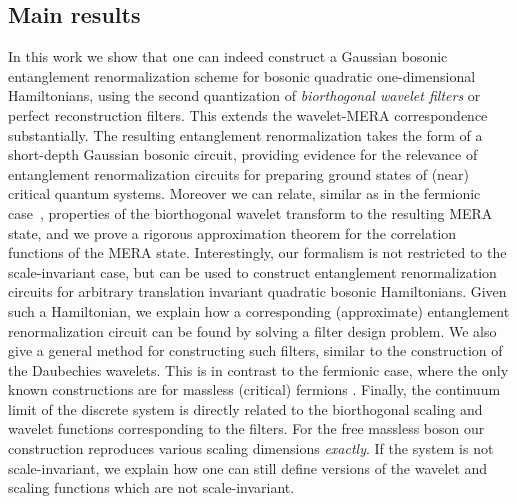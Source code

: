\documentclass[submission, Phys]{SciPost}
\theoremstyle{definition}
\theoremstyle{remark}
\newcommand{\change}[1]{#1}
\begin{document}
\subsection{Main results}

In this work we show that one can indeed construct a Gaussian bosonic entanglement renormalization scheme for bosonic quadratic one-dimensional Hamiltonians, using the second quantization of \emph{biorthogonal wavelet filters} or perfect reconstruction filters.
\change{This extends the wavelet-MERA correspondence substantially.}
The resulting entanglement renormalization takes the form of a short-depth Gaussian bosonic circuit, providing evidence for the relevance of entanglement renormalization circuits for preparing ground states of (near) critical quantum systems.
Moreover we can relate, similar as in the fermionic case~\cite{haegeman2018rigorous}, properties of the biorthogonal wavelet transform to the resulting MERA state, and we prove a rigorous approximation theorem for the correlation functions of the MERA state.
Interestingly, our formalism is not restricted to the scale-invariant case, but can be used to construct entanglement renormalization circuits for arbitrary translation invariant quadratic bosonic Hamiltonians.
Given such a Hamiltonian, we explain how a corresponding (approximate) entanglement renormalization circuit can be found by solving a filter design problem.
We also give a general method for constructing such filters, similar to the construction of the Daubechies wavelets.
\change{This is in contrast to the fermionic case, where the only known constructions are for massless (critical) fermions \cite{evenbly2016entanglement,haegeman2018rigorous}.}
Finally, the continuum limit of the discrete system is directly related to the biorthogonal scaling and wavelet functions corresponding to the filters.
For the free massless boson our construction reproduces various scaling dimensions \emph{exactly}.
If the system is not scale-invariant, we explain how one can still define versions of the wavelet and scaling functions which are not scale-invariant.
\end{document}
